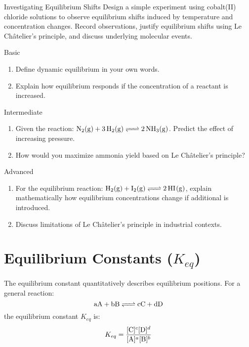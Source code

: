 \begin{investigation}{Investigating Equilibrium Shifts}
Design a simple experiment using cobalt(II) chloride solutions to observe equilibrium shifts induced by temperature and concentration changes. Record observations, justify equilibrium shifts using Le Châtelier’s principle, and discuss underlying molecular events.
\end{investigation}

\FloatBarrier

\begin{tieredquestions}{Basic}
\begin{enumerate}
\item Define dynamic equilibrium in your own words.
\item Explain how equilibrium responds if the concentration of a reactant is increased.
\end{enumerate}
\end{tieredquestions}

\begin{tieredquestions}{Intermediate}
\begin{enumerate}
\item Given the reaction: \(\ce{N2(g) + 3H2(g) <=> 2NH3(g)}\). Predict the effect of increasing pressure.
\item How would you maximize ammonia yield based on Le Châtelier’s principle?
\end{enumerate}
\end{tieredquestions}

\begin{tieredquestions}{Advanced}
\begin{enumerate}
\item For the equilibrium reaction: \(\ce{H2(g) + I2(g) <=> 2HI(g)}\), explain mathematically how equilibrium concentrations change if additional  is introduced.
\item Discuss limitations of Le Châtelier's principle in industrial contexts.
\end{enumerate}
\end{tieredquestions}

\section{Equilibrium Constants ($K_{eq}$)}
The equilibrium constant quantitatively describes equilibrium positions. For a general reaction:
\[
\ce{aA + bB <=> cC + dD}
\]
the equilibrium constant \(K_{eq}\) is:
\[
K_{eq} = \frac{[\ce{C}]^c [\ce{D}]^d}{[\ce{A}]^a[\ce{B}]^b}
\]

